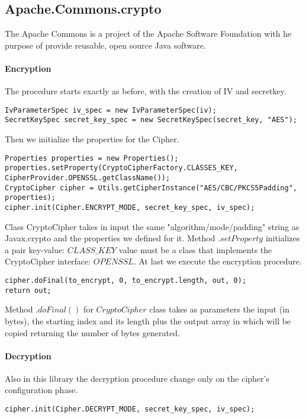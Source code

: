 \documentclass[11pt,a4paper]{article}
\begin{document}
\subsection{Apache.Commons.crypto}
The Apache Commons is a project of the Apache Software Foundation with he purpose of provide reusable, open source Java software.
\paragraph{Encryption}
The procedure starts exactly as before, with the creation of IV and secretkey.
\begin{lstlisting}[backgroundcolor = \color{lightgray}]
IvParameterSpec iv_spec = new IvParameterSpec(iv);
SecretKeySpec secret_key_spec = new SecretKeySpec(secret_key, "AES");
\end{lstlisting}
Then we initialize the properties for the Cipher.
\begin{lstlisting}[backgroundcolor = \color{lightgray}]
Properties properties = new Properties();
properties.setProperty(CryptoCipherFactory.CLASSES_KEY, CipherProvider.OPENSSL.getClassName());
CryptoCipher cipher = Utils.getCipherInstance("AES/CBC/PKCS5Padding", properties);
cipher.init(Cipher.ENCRYPT_MODE, secret_key_spec, iv_spec);
\end{lstlisting}
Class CryptoCipher takes in input the same "algorithm/mode/padding" string as Javax.crypto and the properties we defined for it. \newline 
Method $.setProperty$ initializes a pair key-value: $CLASS\_KEY$ value must be a class that implements the CryptoCipher interface: $OPENSSL$. At last we execute the encryption procedure.
\begin{lstlisting}[backgroundcolor = \color{lightgray}]
cipher.doFinal(to_encrypt, 0, to_encrypt.length, out, 0);
return out;
\end{lstlisting}
Method $.doFinal()$ for $CryptoCipher$ class
takes as parameters the input (in bytes), the starting index and its length plus the output array in which will be copied returning the number of bytes generated.
\paragraph{Decryption}
Also in this library the decryption procedure change only on the cipher's configuration phase.
\begin{lstlisting}[backgroundcolor = \color{lightgray}]
cipher.init(Cipher.DECRYPT_MODE, secret_key_spec, iv_spec);
\end{lstlisting}
\end{document}
